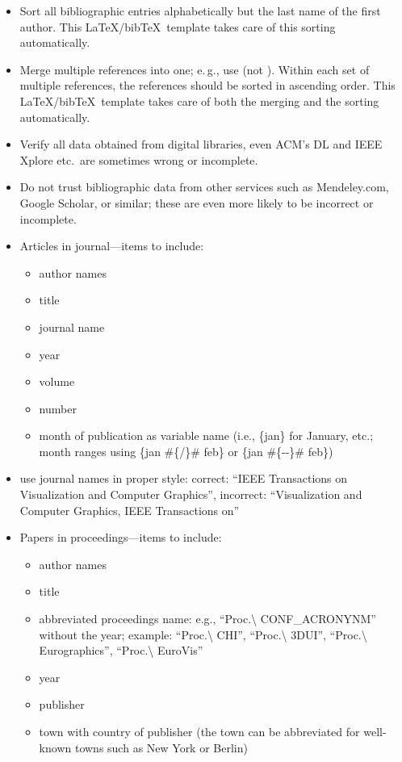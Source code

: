 \documentclass[widereview]{vgtc}             %
\begin{document}
\begin{itemize}
	\item Sort all bibliographic entries alphabetically but the last name of the first author.
	This \LaTeX/bib\TeX\ template takes care of this sorting automatically.
	\item Merge multiple references into one; e.\,g., use \cite{Max:1995:OMF,Kitware:2003} (not \cite{Kitware:2003}\cite{Max:1995:OMF}).
	Within each set of multiple references, the references should be sorted in ascending order.
	This \LaTeX/bib\TeX\ template takes care of both the merging and the sorting automatically.
	\item Verify all data obtained from digital libraries, even ACM's DL and IEEE Xplore  etc.\ are sometimes wrong or incomplete.
	\item Do not trust bibliographic data from other services such as Mendeley.com, Google Scholar, or similar; these are even more likely to be incorrect or incomplete.
	\item Articles in journal---items to include:
		\begin{itemize}
		\item author names
		\item title
		\item journal name
		\item year
		\item volume
		\item number
		\item month of publication as variable name (i.e., \{jan\} for January, etc.; month ranges using \{jan \#\{/\}\# feb\} or \{jan \#\{-{}-\}\# feb\})
		\end{itemize}
	\item use journal names in proper style: correct: ``IEEE Transactions on Visualization and Computer Graphics'', incorrect: ``Visualization and Computer Graphics, IEEE Transactions on''
	\item Papers in proceedings---items to include:
		\begin{itemize}
		\item author names
		\item title
		\item abbreviated proceedings name: e.g., ``Proc.\textbackslash{} CONF\_ACRONYNM'' without the year; example: ``Proc.\textbackslash{} CHI'', ``Proc.\textbackslash{} 3DUI'', ``Proc.\textbackslash{} Eurographics'', ``Proc.\textbackslash{} EuroVis''
		\item year
		\item publisher
		\item town with country of publisher (the town can be abbreviated for well-known towns such as New York or Berlin)
		\end{itemize}
	

\end{itemize}
\end{document}
